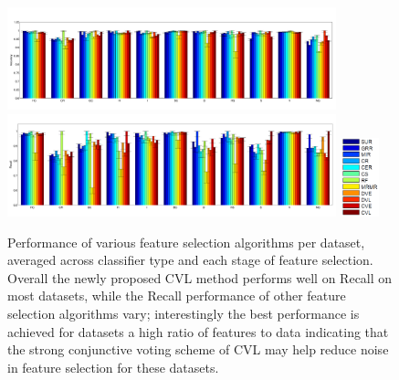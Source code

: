 \begin{figure}[tbp!]
\includegraphics[width=0.85\textwidth]{./figures/dataset_perf/Accuracy.pdf}\\
\includegraphics[width=0.85\textwidth]{./figures/dataset_perf/Recall.pdf}
\includegraphics[width=0.10\textwidth]{./figures/dataset_perf/legend.PNG}
\vspace{-2mm}
\caption{\footnotesize Performance of various feature selection algorithms per dataset, averaged across classifier type and each stage of feature selection.  Overall the newly proposed CVL method performs well on Recall on most datasets, while the Recall performance of other feature selection algorithms vary; interestingly the best performance is achieved for datasets a high ratio of features to data indicating that the strong conjunctive voting scheme of CVL may help reduce noise in feature selection for these datasets. }
\label{fig:perf_vs_dataset}
\vspace{-4mm}
\end{figure}

